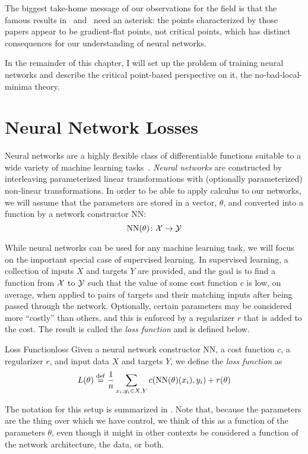 \documentclass[../../thesis.tex]{subfiles}
\begin{document}
The biggest take-home message of our observations for the field
is that the famous results
in~\cite{dauphin2014} and~\cite{pennington2017}
need an asterisk:
the points characterized by those papers appear to be
gradient-flat points, not critical points,
which has distinct consequences for our understanding of neural networks.

In the remainder of this chapter,
I will set up the problem of training neural networks
and describe the critical point-based perspective on it,
the no-bad-local-minima theory.

\section{Neural Network Losses}

Neural networks are a highly flexible class of
differentiable functions
suitable to a wide variety of
machine learning tasks~\cite{lecun2015}.
\emph{Neural networks} are constructed by interleaving
parameterized linear transformations
with (optionally parameterized) non-linear transformations.
In order to be able to apply calculus
to our networks, we will assume that
the parameters are stored in a vector, $\theta$,
and converted into a function by a network constructor $\mathrm{NN}$:
\begin{equation}
	\mathrm{NN}(\theta) \colon {\mathcal{X}} \to {\mathcal{Y}}
\end{equation}

While neural networks can be used for any machine learning task,
we will focus on the important special case of supervised learning.
In supervised learning, a collection of inputs $X$ and targets $Y$
are provided, and the goal is to find a function from ${\mathcal{X}}$ to ${\mathcal{Y}}$
such that the value of some cost function $c$ is low, on average, when applied to
pairs of targets and their matching inputs after being passed through the network.
Optionally, certain parameters may be considered more \enquote{costly}
than others, and this is enforced by a regularizer $r$
that is added to the cost.
The result is called the \emph{loss function}
and is defined below.
\begin{definition}{Loss Function}{loss}
	Given a neural network constructor $\mathrm{NN}$,
	a cost function $c$,
	a regularizer $r$,
	and input data $X$ and targets $Y$,
	we define the \emph{loss function} as
	\begin{equation}\equationlabel{def-loss}
		L(\theta) \defeq \frac{1}{n}\sum_{x_i, y_i \in X, Y} c(\mathrm{NN}(\theta)(x_i), y_i) + r(\theta)
	\end{equation}
\end{definition}
The notation for this setup is summarized in .
Note that,
because the parameters are the thing over which we have control,
we think of this as a function of the parameters $\theta$,
even though it might in other contexts be considered
a function of the network architecture, the data, or both.
\end{document}
